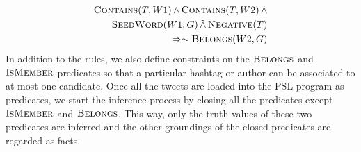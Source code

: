 \begin{align*}
\begin{split}
\textsc{Contains}(T,W1) 
	\softand \textsc{Contains}(T,W2)
	\softand \\
	 \textsc{SeedWord}(W1,G)
	\softand \textsc{Negative}(T)\\
	\Rightarrow \sim \textsc{Belongs}(W2,G)
\end{split}
\end{align*}
In addition to the rules, we also define constraints on the $\textsc{Belongs}$ and $\textsc{IsMember}$ predicates so that a particular hashtag or author can be associated to at most one candidate. 
Once all the tweets are loaded into the PSL program as predicates, we start the inference process by closing all the predicates except $\textsc{IsMember}$ and $\textsc{Belongs}$. 
This way, only the truth values of these two predicates are inferred and the other groundings of the closed predicates are regarded as facts.